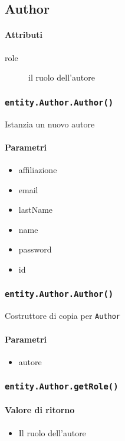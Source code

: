 \subsection{Author}
\paragraph{Attributi}
\begin{description}
\item [role] il ruolo dell'autore
\end{description}

\subsubsection{\texttt{entity.Author.Author()}}
Istanzia un nuovo autore
\paragraph{Parametri}
\begin{itemize}
\item affiliazione
\item email
\item lastName
\item name
\item password
\item id
\end{itemize}

\subsubsection{\texttt{entity.Author.Author()}}
Costruttore di copia per \texttt{Author}
\paragraph{Parametri}
\begin{itemize}
\item autore
\end{itemize}

\subsubsection{\texttt{entity.Author.getRole()}}
\paragraph{Valore di ritorno}
\begin{itemize}
\item Il ruolo dell'autore
\end{itemize}

